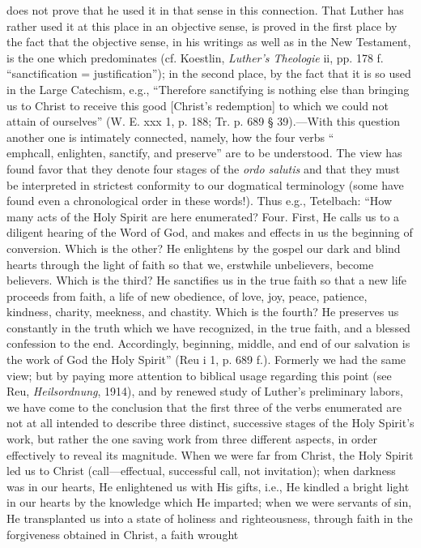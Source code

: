 does not prove that he used it in that sense in this connection. That Luther has rather used it at this place in an objective sense, is proved in the first place by the fact that the objective sense, in his writings as well as in the New Testament, is the one which predominates (cf. Koestlin, \emph{Luther’s Theologie} ii, pp. 178 f. “sanctification = justification”); in the second place, by the fact that it is so used in the Large Catechism, e.g., “Therefore sanctifying is nothing else than bringing us to Christ to receive this good [Christ’s redemption] to which we could not attain of ourselves” (W. E. xxx 1, p. 188; Tr. p. 689 § 39).—With this question another one is intimately connected, namely, how the four verbs “\\emph{call, enlighten, sanctify, and preserve}” are to be understood. The view has found favor that they denote four stages of the \emph{ordo salutis} and that they must be interpreted in strictest conformity to our dogmatical terminology (some have found even a chronological order in these words!). Thus e.g., Tetelbach: “How many acts of the Holy Spirit are here enumerated? Four. First, He calls us to a diligent hearing of the Word of God, and makes and effects in us the beginning of conversion. Which is the other? He enlightens by the gospel our dark and blind hearts through the light of faith so that we, erstwhile unbelievers, become believers. Which is the third? He sanctifies us in the true faith so that a new life proceeds from faith, a life of new obedience, of love, joy, peace, patience, kindness, charity, meekness, and chastity. Which is the fourth? He preserves us constantly in the truth which we have recognized, in the true faith, and a blessed confession to the end. Accordingly, beginning, middle, and end of our salvation is the work of God the Holy Spirit” (Reu i 1, p. 689 f.). Formerly we had the same view; but by paying more attention to biblical usage regarding this point (see Reu, \emph{Heilsordnung}, 1914), and by renewed study of Luther’s preliminary labors, we have come to the conclusion that the first three of the verbs enumerated are not at all intended to describe three distinct, successive stages of the Holy Spirit’s work, but rather the one saving work from three different aspects, in order effectively to reveal its magnitude. When we were far from Christ, the Holy Spirit led us to Christ (call—effectual, successful call, not invitation); when darkness was in our hearts, He enlightened us with His gifts, i.e., He kindled a bright light in our hearts by the knowledge which He imparted; when we were servants of sin, He transplanted us into a state of holiness and righteousness, through faith in the forgiveness obtained in Christ, a faith wrought
